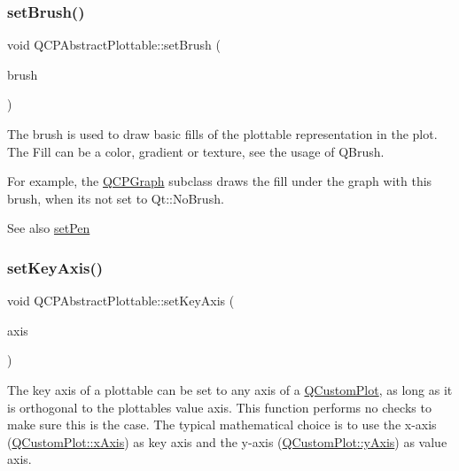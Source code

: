 \subsubsection{\texorpdfstring{set\+Brush()}{setBrush()}}
{\footnotesize\ttfamily void Q\+C\+P\+Abstract\+Plottable\+::set\+Brush (\begin{DoxyParamCaption}\item[{const Q\+Brush \&}]{brush }\end{DoxyParamCaption})}

The brush is used to draw basic fills of the plottable representation in the plot. The Fill can be a color, gradient or texture, see the usage of Q\+Brush.

For example, the \hyperlink{class_q_c_p_graph}{Q\+C\+P\+Graph} subclass draws the fill under the graph with this brush, when it\textquotesingle{}s not set to Qt\+::\+No\+Brush.

\begin{DoxySeeAlso}{See also}
\hyperlink{class_q_c_p_abstract_plottable_ab74b09ae4c0e7e13142fe4b5bf46cac7}{set\+Pen} 
\end{DoxySeeAlso}
\mbox{\label{class_q_c_p_abstract_plottable_a8524fa2994c63c0913ebd9bb2ffa3920}} 
\subsubsection{\texorpdfstring{set\+Key\+Axis()}{setKeyAxis()}}
{\footnotesize\ttfamily void Q\+C\+P\+Abstract\+Plottable\+::set\+Key\+Axis (\begin{DoxyParamCaption}\item[{\hyperlink{class_q_c_p_axis}{Q\+C\+P\+Axis} $\ast$}]{axis }\end{DoxyParamCaption})}

The key axis of a plottable can be set to any axis of a \hyperlink{class_q_custom_plot}{Q\+Custom\+Plot}, as long as it is orthogonal to the plottable\textquotesingle{}s value axis. This function performs no checks to make sure this is the case. The typical mathematical choice is to use the x-\/axis (\hyperlink{class_q_custom_plot_a9a79cd0158a4c7f30cbc702f0fd800e4}{Q\+Custom\+Plot\+::x\+Axis}) as key axis and the y-\/axis (\hyperlink{class_q_custom_plot_af6fea5679725b152c14facd920b19367}{Q\+Custom\+Plot\+::y\+Axis}) as value axis.

